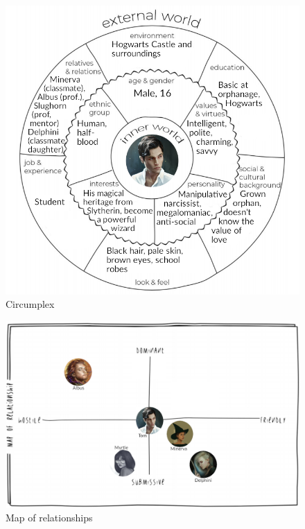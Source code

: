 \begin{figure}[H]
\includegraphics[max width=\textwidth]{../Pictures/Characters/Circumplexes/Tom_circumplex.png} 
\captionsetup{labelformat=empty}
\caption{Circumplex}
\end{figure}

\begin{figure}[H]
\includegraphics[max width=\textwidth]{../Pictures/Characters/Relationship_maps/Tom_relmap.png} 
\captionsetup{labelformat=empty}
\caption{Map of relationships}
\end{figure}


\clearpage